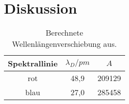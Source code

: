 \section{Diskussion}
\label{sec:Diskussion}

\FloatBarrier
\begin{table}
    \centering
    \caption{Berechnete Wellenlängenverschiebung aus.}
    \label{tab:v1}
    \begin{tabular}{c S[table-format=2.1] S[table-format=6.0] }
      \toprule
       {Spektrallinie} & {$\lambda_{\si{D}}/\si{pm}$}& {$A$}\\
      \midrule
      \midrule
        rot & 48,9 & 209129 \\
        blau & 27,0 & 285458 \\
      \bottomrule
    \end{tabular}
\end{table}
\FloatBarrier

